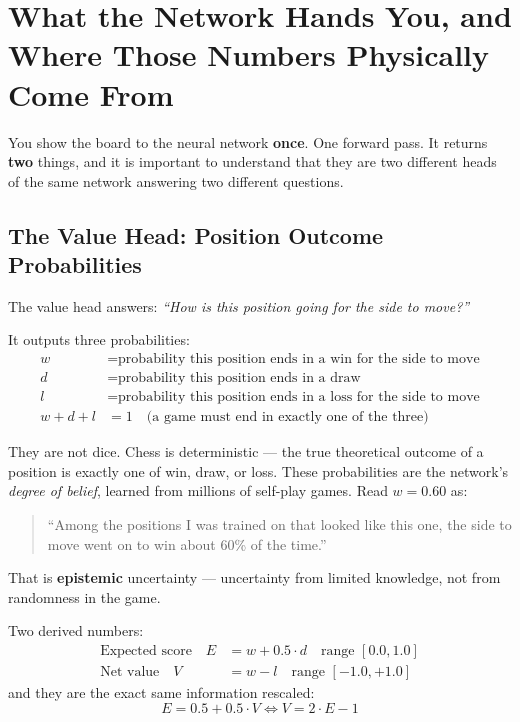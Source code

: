 \chapter{What the Network Hands You, and Where Those Numbers Physically Come From}
\label{ch:network_outputs}

You show the board to the neural network \textbf{once}. One forward pass. It returns \textbf{two} things, and it is important to understand that they are two different heads of the same network answering two different questions.

\section{The Value Head: Position Outcome Probabilities}

The value head answers: \textit{``How is this position going for the side to move?''}

It outputs three probabilities:
\begin{align*}
  w &= \text{probability this position ends in a win for the side to move} \\
  d &= \text{probability this position ends in a draw} \\
  l &= \text{probability this position ends in a loss for the side to move} \\[1ex]
  w + d + l &= 1 \quad \text{(a game must end in exactly one of the three)}
\end{align*}

\begin{established}
They are not dice. Chess is deterministic --- the true theoretical outcome of a position is exactly one of win, draw, or loss. These probabilities are the network's \textit{degree of belief}, learned from millions of self-play games. Read $w = 0.60$ as:
\begin{quote}
``Among the positions I was trained on that looked like this one, the side to move went on to win about 60\% of the time.''
\end{quote}
That is \textbf{epistemic} uncertainty --- uncertainty from limited knowledge, not from randomness in the game.
\end{established}

Two derived numbers:
\begin{align*}
  \text{Expected score} \quad E &= w + 0.5 \cdot d \quad \text{range } [0.0, 1.0] \\
  \text{Net value} \quad V &= w - l \quad \text{range } [-1.0, +1.0]
\end{align*}
and they are the exact same information rescaled:
\begin{equation}
  E = 0.5 + 0.5 \cdot V \iff V = 2 \cdot E - 1
\end{equation}

